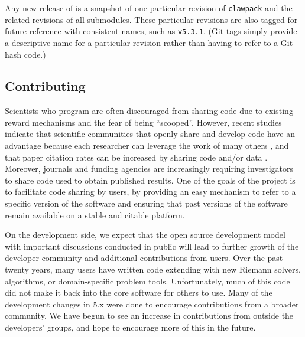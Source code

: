 Any new release of \clawpack is a snapshot of one particular revision of
\texttt{clawpack} and the related revisions of all submodules.  These
particular revisions are also tagged for future reference with consistent
names, such as \texttt{v5.3.1}.  (Git tags simply provide a descriptive name
for a particular revision rather than having to refer to a Git hash code.)


\subsection{Contributing}

Scientists who program are often discouraged from sharing code
due to existing reward mechanisms and the fear of being ``scooped''.
However, recent studies indicate that
scientific communities that openly share and develop code
have an advantage because each researcher can leverage the work of
many others \cite{Turk:2013hd}, and that paper citation rates can be
increased by sharing code \cite{Vandewalle2012} and/or
data \cite{PiwowarDayEtAl2007}.
Moreover, journals and funding agencies are increasingly requiring
investigators to share code used to obtain published results.  One
of the goals of the \clawpack project is to facilitate code sharing
by users, by providing an easy mechanism to refer to a specific
version of the \clawpack software and ensuring that past versions
of the software remain available on a stable and citable platform.

On the development side, we expect that the open source development model
with important discussions conducted in public will lead to further growth of
the developer community and additional contributions from users.
Over the past twenty years, many users have written
code extending \clawpack with new Riemann solvers, algorithms, or
domain-specific problem tools.  Unfortunately, much of this code did not
make it back into the core software for others to use.
Many of the development changes in \clawpack 5.x were done
to encourage contributions from a broader community. We have begun to see an
increase in contributions from outside the developers' groups, and hope to
encourage more of this in the future.

